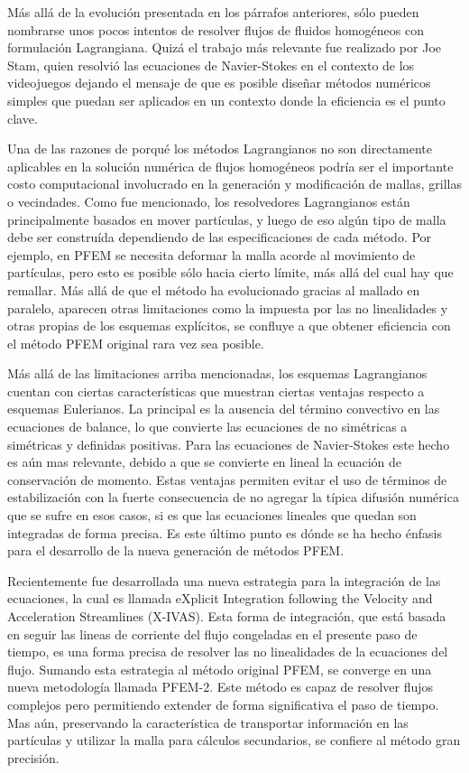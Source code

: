\documentclass[a4paper,conference]{IEEEtran}
\begin{document}
Más allá de la evolución presentada en los párrafos anteriores, sólo pueden nombrarse unos pocos intentos de resolver flujos de fluidos homogéneos con formulación Lagrangiana. Quizá el trabajo más relevante fue realizado por Joe Stam\cite{Stam99}\cite{Stam10}, quien resolvió las ecuaciones de Navier-Stokes en el contexto de los videojuegos dejando el mensaje de que es posible diseñar métodos numéricos simples que puedan ser aplicados en un contexto donde la eficiencia es el punto clave.

Una de las razones de porqué los métodos Lagrangianos no son directamente aplicables en la solución numérica de flujos homogéneos podría ser el importante costo computacional involucrado en la generación y modificación de mallas, grillas o vecindades. Como fue mencionado, los resolvedores Lagrangianos están principalmente basados en mover partículas, y luego de eso algún tipo de malla debe ser construída dependiendo de las especificaciones de cada método. Por ejemplo, en PFEM se necesita deformar la malla acorde al movimiento de partículas, pero esto es posible sólo hacia cierto límite, más allá del cual hay que remallar. Más allá de que el método ha evolucionado gracias al mallado en paralelo, aparecen otras limitaciones como la impuesta por las no linealidades y otras propias de los esquemas explícitos, se confluye a que obtener eficiencia con el método PFEM original rara vez sea posible.

Más allá de las limitaciones arriba mencionadas, los esquemas Lagrangianos cuentan con ciertas características que muestran ciertas ventajas respecto a esquemas Eulerianos. La principal es la ausencia del término convectivo en las ecuaciones de balance, lo que convierte las ecuaciones de no simétricas a simétricas y definidas positivas. Para las ecuaciones de Navier-Stokes este hecho es aún mas relevante, debido a que se convierte en lineal la ecuación de conservación de momento. Estas ventajas permiten evitar el uso de términos de estabilización con la fuerte consecuencia de no agregar la típica difusión numérica que se sufre en esos casos, si es que las ecuaciones lineales que quedan son integradas de forma precisa. Es este último punto es dónde se ha hecho énfasis para el desarrollo de la nueva generación de métodos PFEM.

Recientemente fue desarrollada una nueva estrategia para la integración de las ecuaciones, la cual es llamada eXplicit Integration following the Velocity and Acceleration Streamlines (X-IVAS)\cite{Idelsohn12}. Esta forma de integración, que está basada en seguir las lineas de corriente del flujo congeladas en el presente paso de tiempo, es una forma precisa de resolver las no linealidades de la ecuaciones del flujo. Sumando esta estrategia al método original PFEM, se converge en una nueva metodología llamada PFEM-2\cite{Idelsohn12b}. Este método es capaz de resolver flujos complejos pero permitiendo extender de forma significativa el paso de tiempo. Mas aún, preservando la característica de transportar información en las partículas y utilizar la malla para cálculos secundarios, se confiere al método gran precisión.
\end{document}
